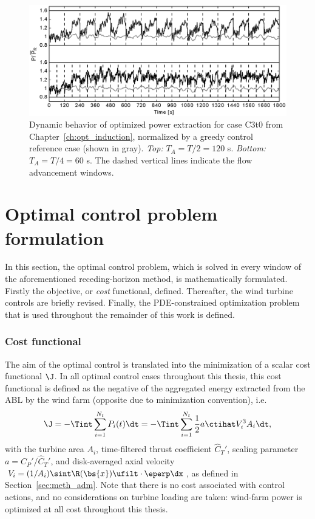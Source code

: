 \begin{figure}
	\centering
	\includegraphics[width=\linewidth]{chapters/optimal_control_problem/figure10.eps}
	\caption[Dynamic behavior of optimized power extraction for case C3t0 from Chapter~\ref{ch:opt_induction}, normalized by a greedy control reference case.]{Dynamic behavior of optimized power extraction for case C3t0 from Chapter~\ref{ch:opt_induction}, normalized by a greedy control reference case (shown in gray). \emph{Top: } $T_A = T/2 = 120$ s. \emph{Bottom: } $T_A = T/4 = 60$ s. The dashed vertical lines indicate the flow advancement windows.\label{fig:T_A}}
\end{figure}


\section{Optimal control problem formulation}\label{sec:problem_formulation}

In this section, the optimal control problem, which is solved in every window of the aforementioned receding-horizon method, is mathematically formulated. Firstly the objective, or \emph{cost} functional, defined. Thereafter, the wind turbine controls are briefly revised. Finally, the PDE-constrained optimization problem that is used throughout the remainder of this work is defined. 

\subsubsection{Cost functional}
The aim of the optimal control is translated into the minimization of a scalar cost functional $\J$. In all optimal control cases throughout this thesis, this cost functional is defined as the negative of the aggregated energy extracted from the ABL by the wind farm (opposite due to minimization convention), i.e.
\begin{equation}\label{eq:costfunction}
	\J = - \Tint \sum_{i=1}^{N_t} P_i(t) \dt = - \Tint \sum_{i=1}^{N_t} \frac{1}{2} a \ctihat V_i^3 A_i \dt,
\end{equation}
with the turbine area $A_i$, time-filtered thrust coefficient $\widehat{C}_T'$, scaling parameter $a = C_P'/\widehat{C}_T'$, and disk-averaged axial velocity $V_i = (1/A_i) \sint  \R(\bs{x}) \ufilt \cdot \eperp \dx$, as defined in Section~\ref{sec:meth_adm}. Note that there is no cost associated with control actions, and no considerations on turbine loading are taken: wind-farm power is optimized at all cost throughout this thesis. 

